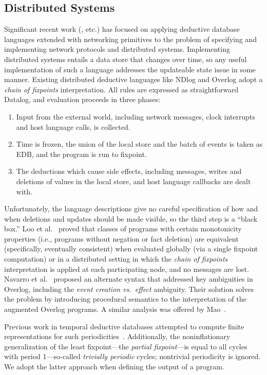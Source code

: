 \subsection{Distributed Systems}

Significant recent work (\cite{boom-techr,Belaramani:2009,Chu:2007,Loo2009-CACM}, etc.) has focused on applying deductive database languages extended with networking 
primitives to the problem of specifying and implementing network protocols and distributed systems.  Implementing distributed systems entails 
a data store that changes over time, so any useful implementation of such a language addresses the updateable state issue in some manner. 
Existing distributed deductive languages like NDlog and Overlog adopt a \emph{chain of fixpoints} interpretation.  All rules are expressed as 
straightforward Datalog, and evaluation proceeds in three phases:

\begin{enumerate}
\item Input from the external world, including network messages, clock interrupts and host language calls, is collected.
\item Time is frozen, the union of the local store and the batch of events is taken as EDB, and the program is run to fixpoint.
\item The deductions which cause side effects, including messages, writes and deletions of values in the local store, and host language callbacks are dealt with.  
\end{enumerate}

Unfortunately, the language descriptions give no careful specification of how and when deletions and updates
should be made visible, so the third step is a ``black box.''  Loo et al.~\cite{loo-sigmod06} proved that classes of programs with certain 
monotonicity properties (i.e., programs without negation or fact deletion)
are equivalent (specifically, eventually consistent) when evaluated globally (via a single fixpoint computation) or in a distributed setting in which the 
\emph{chain of fixpoints} interpretation is applied at each participating node, and no messages are lost.
Navarro et al.~\cite{navarro} proposed an alternate syntax that addressed key ambiguities in Overlog, including the
\emph{event creation vs.\ effect} ambiguity.  Their solution solves the problem by introducing procedural semantics to the interpretation of 
the augmented Overlog programs.  A similar analysis was offered by Mao~\cite{Mao2009}.



Previous work in temporal deductive databases attempted to compute finite representations for such periodicities~\cite{tdd-infinite}.  Additionally, the noninflationary generalization of the least fixpoint---the {\em partial fixpoint}---is equal to all cycles with period 1---so-called {\em trivially periodic} cycles; nontrivial periodicity is ignored.  We adopt the latter approach when defining the output of a \lang program.
